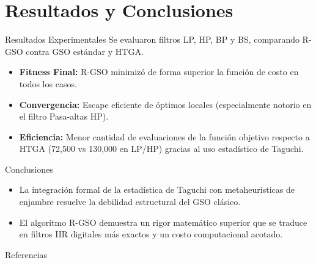 \documentclass[10pt]{beamer}
\begin{document}
\section{Resultados y Conclusiones}

\begin{frame}{Resultados Experimentales}
  Se evaluaron filtros LP, HP, BP y BS, comparando R-GSO contra GSO estándar y HTGA.
  \begin{itemize}
    \item \textbf{Fitness Final:} R-GSO minimizó de forma superior la función de costo en todos los casos.
    \item \textbf{Convergencia:} Escape eficiente de óptimos locales (especialmente notorio en el filtro Pasa-altas HP).
    \item \textbf{Eficiencia:} Menor cantidad de evaluaciones de la función objetivo respecto a HTGA (72,500 vs 130,000 en LP/HP) gracias al uso estadístico de Taguchi.
  \end{itemize}
\end{frame}

\begin{frame}{Conclusiones}
  \begin{itemize}
    \item La integración formal de la estadística de Taguchi con metaheurísticas de enjambre resuelve la debilidad estructural del GSO clásico.
    \item El algoritmo R-GSO demuestra un rigor matemático superior que se traduce en filtros IIR digitales más exactos y un costo computacional acotado.
  \end{itemize}
\end{frame}

\begin{frame}[allowframebreaks]{Referencias}
  \nocite{*}
  
  
\end{frame}
\end{document}
